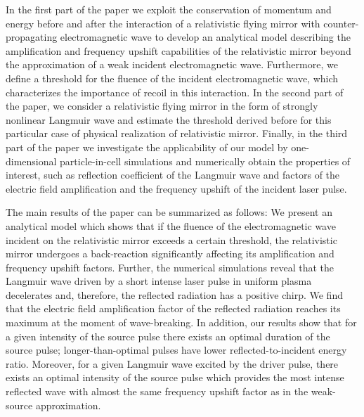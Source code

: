 \documentclass[10pt, a4paper, twoside, openright]{report}
\begin{document}
In the first part of the paper we exploit the conservation of momentum and energy before and after the interaction of a relativistic flying mirror with counter-propagating electromagnetic wave to develop an analytical model describing the amplification and frequency upshift capabilities of the relativistic mirror beyond the approximation of a weak incident electromagnetic wave. Furthermore, we define a threshold for the fluence of the incident electromagnetic wave, which characterizes the importance of recoil in this interaction. In the second part of the paper, we consider a relativistic flying mirror in the form of strongly nonlinear Langmuir wave and estimate the threshold derived before for this particular case of physical realization of relativistic mirror. Finally, in the third part of the paper we investigate the applicability of our model by one-dimensional particle-in-cell simulations and numerically obtain the properties of interest, such as reflection coefficient of the Langmuir wave and factors of the electric field amplification and the frequency upshift of the incident laser pulse.

The main results of the paper can be summarized as follows: We present an analytical model which shows that if the fluence of the electromagnetic wave incident on the relativistic mirror exceeds a certain threshold, the relativistic mirror undergoes a back-reaction significantly affecting its amplification and frequency upshift factors. Further, the numerical simulations reveal that the Langmuir wave driven by a short intense laser pulse in uniform plasma decelerates and, therefore, the reflected radiation has a positive chirp. We find that the electric field amplification factor of the reflected radiation reaches its maximum at the moment of wave-breaking. In addition, our results show that for a given intensity of the source pulse there exists an optimal duration of the source pulse; longer-than-optimal pulses have lower reflected-to-incident energy ratio. Moreover, for a given Langmuir wave excited by the driver pulse, there exists an optimal intensity of the source pulse which provides the most intense reflected wave with almost the same frequency upshift factor as in the weak-source approximation.
\end{document}
